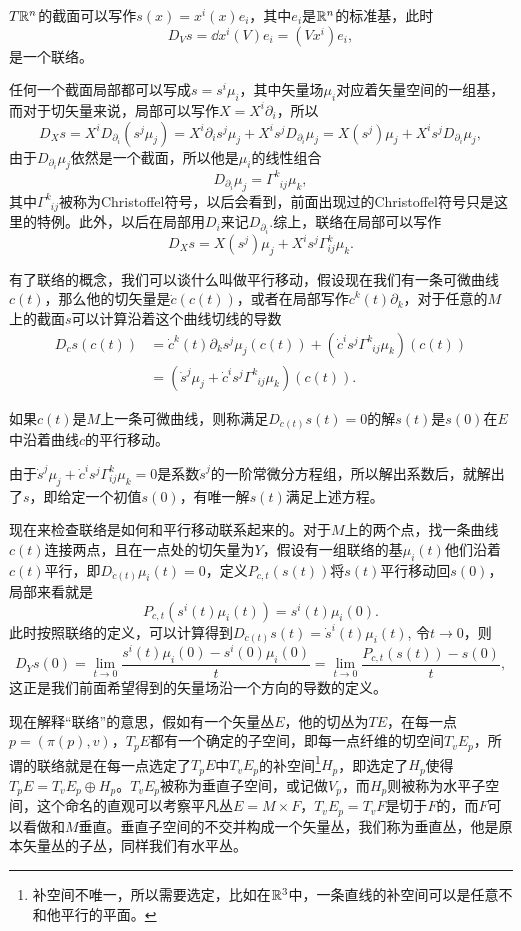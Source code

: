 $T\mathbb{R}^n$的截面可以写作$s(x)=x^i(x)e_i$，其中$e_i$是$\mathbb{R}^n$的标准基，此时
\[
	D_Vs=\dd x^i(V) e_i=(Vx^i)e_i,
\]
是一个联络。

任何一个截面局部都可以写成$s=s^i\mu_i$，其中矢量场$\mu_i$对应着矢量空间的一组基，而对于切矢量来说，局部可以写作$X=X^i\partial_i$，所以
\[
	D_Xs=X^iD_{\partial_i}(s^j\mu_j)=X^i\partial_i s^j\mu_j+X^is^jD_{\partial_i}\mu_j=X(s^j)\mu_j+X^is^jD_{\partial_i}\mu_j,
\]
由于$D_{\partial_i}\mu_j$依然是一个截面，所以他是$\mu_i$的线性组合
\[
	D_{\partial_i}\mu_j=\Gamma^k_{\phantom{k}ij}\mu_k,
\]
其中$\Gamma^k_{\phantom{k}ij}$被称为Christoffel符号，以后会看到，前面出现过的Christoffel符号只是这里的特例。此外，以后在局部用$D_i$来记$D_{\partial_i}$.综上，联络在局部可以写作
\[
	D_Xs=X(s^j)\mu_j+X^is^j\Gamma^{k}_{ij}\mu_k.
\]

有了联络的概念，我们可以谈什么叫做平行移动，假设现在我们有一条可微曲线$c(t)$，那么他的切矢量是$\dot{c}(c(t))$，或者在局部写作$\dot{c}^k(t)\partial_k$，对于任意的$M$上的截面$s$可以计算沿着这个曲线切线的导数
\begin{align*}
	D_{\dot{c}}s(c(t))&=\dot{c}^k(t)\partial_ks^j\mu_j(c(t))+(\dot{c}^i s^j\Gamma^k_{\phantom{k}ij}\mu_k)(c(t))\\
	&=\left(\dot{s}^j\mu_j+\dot{c}^i s^j\Gamma^k_{\phantom{k}ij}\mu_k\right)(c(t)).
\end{align*}
\begin{defi}
	如果$c(t)$是$M$上一条可微曲线，则称满足$D_{\dot{c}(t)}s(t)=0$的解$s(t)$是$s(0)$在$E$中沿着曲线$c$的平行移动。
\end{defi}

由于$\dot{s}^j\mu_j+\dot{c}^i s^j\Gamma^{k}_{ij}\mu_k=0$是系数$\dot{s}^j$的一阶常微分方程组，所以解出系数后，就解出了$s$，即给定一个初值$s(0)$，有唯一解$s(t)$满足上述方程。

现在来检查联络是如何和平行移动联系起来的。对于$M$上的两个点，找一条曲线$c(t)$连接两点，且在一点处的切矢量为$Y$，假设有一组联络的基$\mu_i(t)$他们沿着$c(t)$平行，即$D_{\dot{c}(t)}\mu_i(t)=0$，定义$P_{c,t}(s(t))$将$s(t)$平行移动回$s(0)$，局部来看就是
\[
	P_{c,t}(s^i(t)\mu_i(t))=s^i(t)\mu_i(0).
\]
此时按照联络的定义，可以计算得到$D_{\dot{c}(t)}s(t)=\dot{s}^i(t)\mu_i(t)$,
令$t\to 0$，则
\[
	D_{Y}s(0)=\lim_{t\to 0}\frac{s^i(t)\mu_i(0)-s^i(0)\mu_i(0)}{t}=\lim_{t\to 0}\frac{P_{c,t}(s(t))-s(0)}{t},
\]
这正是我们前面希望得到的矢量场沿一个方向的导数的定义。

现在解释“联络”的意思，假如有一个矢量丛$E$，他的切丛为$TE$，在每一点$p=(\pi(p),v)$，$T_pE$都有一个确定的子空间，即每一点纤维的切空间$T_vE_p$，所谓的联络就是在每一点选定了$T_pE$中$T_vE_p$的补空间\footnote{补空间不唯一，所以需要选定，比如在$\mathbb{R}^3$中，一条直线的补空间可以是任意不和他平行的平面。}$H_p$，即选定了$H_p$使得$T_pE=T_vE_p\oplus H_p$。$T_vE_p$被称为垂直子空间，或记做$V_p$，而$H_p$则被称为水平子空间，这个命名的直观可以考察平凡丛$E=M\times F$，$T_vE_p=T_v F$是切于$F$的，而$F$可以看做和$M$垂直。垂直子空间的不交并构成一个矢量丛，我们称为垂直丛，他是原本矢量丛的子丛，同样我们有水平丛。

